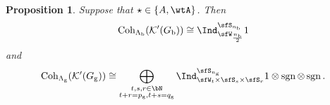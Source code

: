 \documentclass[12pt]{amsart}
\newcommand{\CK}{{\mathcal {K}}}
\newcommand{\sgn}{\operatorname{sgn}}
\renewcommand{\t}{\mathfrak t}
\numberwithin{equation}{section}
\newtheorem{prop}[thm]{Proposition}
\newtheorem{defn}[thm]{Definition}
\theoremstyle{remark}
\def\ckG{\check{G}}
\def\dBV{d_{\mathrm{BV}}}
\def\YD{\mathsf{YD}}
\def\lamck{\lambda_\ckcO}
\def\AND{\quad \text{and} \quad}
\def\Coh{\mathrm{Coh}}
\def\Spr{\mathrm{Springer}}
\begin{document}
\begin{prop}\label{count002}
Suppose that $\star\in \{A, \wtA\}$.   Then
    \[
       \Coh_{\Lambda_\mathrm b}(\CK'(G_\mathrm b)) \cong  \Ind_{\sfW_{\frac{n_{\mathrm b}}{2}}}^{\sfS_{n_{\mathrm b}}} 1
    \]
    and
    \[
       \Coh_{\Lambda_\mathrm g}(\CK'(G_\mathrm g)) \cong  \bigoplus_{\substack{t,s,r\in \bN\\t+r=p_\mathrm g, t+s = q_\mathrm g}}
    \Ind_{\sfW_{t}\times \sfS_s\times \sfS_r}^{\sfS_{n_\mathrm g}}
 1\otimes \sgn \otimes \sgn.
    \]
    \end{prop}













\end{document}
